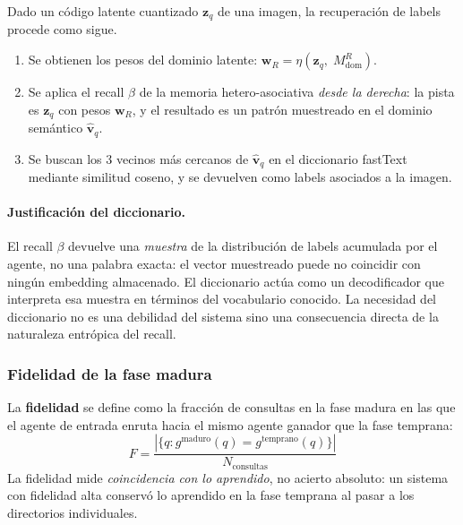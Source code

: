 Dado un código latente cuantizado $\mathbf{z}_q$ de una imagen, la recuperación
de labels procede como sigue.

\begin{enumerate}
    \item Se obtienen los pesos del dominio latente:
    $\mathbf{w}_R = \eta(\mathbf{z}_q,\; M^R_{\mathrm{dom}})$.

    \item Se aplica el recall $\beta$ de la memoria hetero-asociativa \emph{desde la
    derecha}: la pista es $\mathbf{z}_q$ con pesos $\mathbf{w}_R$, y el resultado es un
    patrón muestreado en el dominio semántico $\hat{\mathbf{v}}_q$.

    \item Se buscan los 3 vecinos más cercanos de $\hat{\mathbf{v}}_q$ en el diccionario
    fastText mediante similitud coseno, y se devuelven como labels asociados a la imagen.
\end{enumerate}

\paragraph{Justificación del diccionario.}
El recall $\beta$ devuelve una \emph{muestra} de la distribución de labels acumulada
por el agente, no una palabra exacta: el vector muestreado puede no coincidir con ningún
embedding almacenado.
El diccionario actúa como un decodificador que interpreta esa muestra en términos del
vocabulario conocido.
La necesidad del diccionario no es una debilidad del sistema sino una consecuencia
directa de la naturaleza entrópica del recall.

\subsubsection*{Fidelidad de la fase madura}

La \textbf{fidelidad} se define como la fracción de consultas en la fase madura en las
que el agente de entrada enruta hacia el mismo agente ganador que la fase temprana:
\begin{equation}
    F = \frac{|\{q : g^{\mathrm{maduro}}(q) = g^{\mathrm{temprano}}(q)\}|}{N_{\mathrm{consultas}}}
    \label{eq:fidelidad}
\end{equation}
La fidelidad mide \emph{coincidencia con lo aprendido}, no acierto absoluto:
un sistema con fidelidad alta conservó lo aprendido en la fase temprana al pasar
a los directorios individuales.
